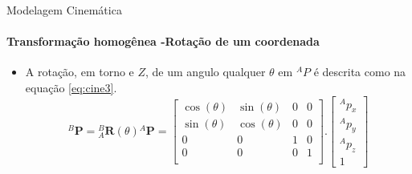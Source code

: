 \documentclass{beamer}
\begin{document}
\begin{frame}{Modelagem Cinemática}
    \framesubtitle{Transformação homogênea -Rotação de um coordenada}
    \begin{itemize}
        \item A rotação, em torno e $Z $, de um angulo qualquer $\theta$ em ${}^AP$ é descrita como na equação \eqref{eq:cine3}.
              \begin{equation}\label{eq:cine3}
                  {}^B\mathbf{P} = {}_A^B \mathbf{R}(\theta) {}^A\mathbf{P} =
                  \begin{bmatrix}
                      \cos(\theta) & \sin(\theta) & 0 & 0 \\
                      \sin(\theta) & \cos(\theta) & 0 & 0 \\
                      0            & 0            & 1 & 0 \\
                      0            & 0            & 0 & 1 \\
                  \end{bmatrix}.
                  \begin{bmatrix}
                      {}^Ap_x \\
                      {}^Ap_y \\
                      {}^Ap_z \\
                      1
                  \end{bmatrix}
              \end{equation}
    \end{itemize}
\end{frame}
\end{document}
